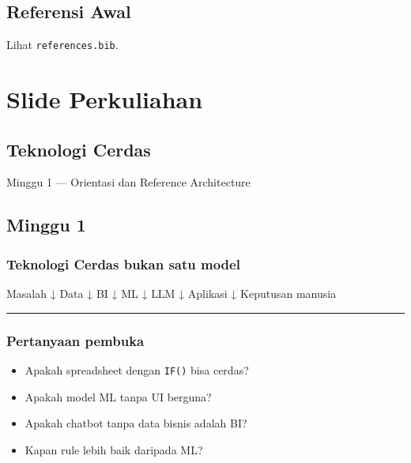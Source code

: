 \documentclass[
  indonesian,
  letterpaper,
  DIV=11,
  numbers=noendperiod]{scrreprt}
\newenvironment{Shaded}{\begin{snugshade}}{\end{snugshade}}
\newcommand{\NormalTok}[1]{\textcolor[rgb]{0.00,0.23,0.31}{#1}}
\providecommand{\tightlist}{%
  \setlength{\itemsep}{0pt}\setlength{\parskip}{0pt}}
\begin{document}

\chapter{Referensi Awal}\label{referensi-awal}

Lihat \texttt{references.bib}.

\part{Slide Perkuliahan}

\chapter{Teknologi Cerdas}\label{teknologi-cerdas-1}

Minggu 1 --- Orientasi dan Reference Architecture

\hfill\break

\chapter{Minggu 1}\label{minggu-1}

\section{Teknologi Cerdas bukan satu
model}\label{teknologi-cerdas-bukan-satu-model}

\begin{Shaded}
\begin{Highlighting}[]
\NormalTok{Masalah}
\NormalTok{  ↓}
\NormalTok{Data}
\NormalTok{  ↓}
\NormalTok{BI}
\NormalTok{  ↓}
\NormalTok{ML}
\NormalTok{  ↓}
\NormalTok{LLM}
\NormalTok{  ↓}
\NormalTok{Aplikasi}
\NormalTok{  ↓}
\NormalTok{Keputusan manusia}
\end{Highlighting}
\end{Shaded}

\begin{center}\rule{0.5\linewidth}{0.5pt}\end{center}

\section{Pertanyaan pembuka}\label{pertanyaan-pembuka}

\begin{itemize}
\tightlist
\item
  Apakah spreadsheet dengan \texttt{IF()} bisa cerdas?
\item
  Apakah model ML tanpa UI berguna?
\item
  Apakah chatbot tanpa data bisnis adalah BI?
\item
  Kapan rule lebih baik daripada ML?
\end{itemize}
\end{document}
